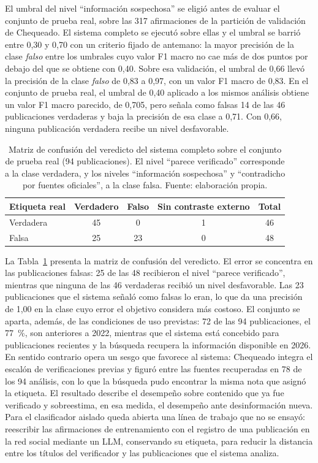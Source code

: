 El umbral del nivel \enquote{información sospechosa} se eligió antes de evaluar el conjunto de prueba real, sobre las 317 afirmaciones de la partición de validación de Chequeado. El sistema completo se ejecutó sobre ellas y el umbral se barrió entre 0,30 y 0,70 con un criterio fijado de antemano: la mayor precisión de la clase \textit{falso} entre los umbrales cuyo valor F1 macro no cae más de dos puntos por debajo del que se obtiene con 0,40. Sobre esa validación, el umbral de 0,66 llevó la precisión de la clase \textit{falso} de 0,83 a 0,97, con un valor F1 macro de 0,83. En el conjunto de prueba real, el umbral de 0,40 aplicado a los mismos análisis obtiene un valor F1 macro parecido, de 0,705, pero señala como falsas 14 de las 46 publicaciones verdaderas y baja la precisión de esa clase a 0,71. Con 0,66, ninguna publicación verdadera recibe un nivel desfavorable.

\begin{table}[t]
  \centering
  \small
  \caption{Matriz de confusión del veredicto del sistema completo sobre el conjunto de prueba real (94 publicaciones). El nivel \enquote{parece verificado} corresponde a la clase verdadera, y los niveles \enquote{información sospechosa} y \enquote{contradicho por fuentes oficiales}, a la clase falsa. Fuente: elaboración propia.}
  \label{tab:matriz-sistema}
  \begin{tabular}{@{}l c c c c@{}}
    \hline
    \textbf{Etiqueta real} & \textbf{Verdadero} & \textbf{Falso} & \textbf{Sin contraste externo} & \textbf{Total} \\
    \hline
    Verdadera & 45 & 0 & 1 & 46 \\
    Falsa & 25 & 23 & 0 & 48 \\
    \hline
  \end{tabular}
\end{table}

La Tabla~\ref{tab:matriz-sistema} presenta la matriz de confusión del veredicto. El error se concentra en las publicaciones falsas: 25 de las 48 recibieron el nivel \enquote{parece verificado}, mientras que ninguna de las 46 verdaderas recibió un nivel desfavorable. Las 23 publicaciones que el sistema señaló como falsas lo eran, lo que da una precisión de 1,00 en la clase cuyo error el objetivo considera más costoso. El conjunto se aparta, además, de las condiciones de uso previstas: 72 de las 94 publicaciones, el 77~\%, son anteriores a 2022, mientras que el sistema está concebido para publicaciones recientes y la búsqueda recupera la información disponible en 2026. En sentido contrario opera un sesgo que favorece al sistema: Chequeado integra el escalón de verificaciones previas y figuró entre las fuentes recuperadas en 78 de los 94 análisis, con lo que la búsqueda pudo encontrar la misma nota que asignó la etiqueta. El resultado describe el desempeño sobre contenido que ya fue verificado y sobreestima, en esa medida, el desempeño ante desinformación nueva. Para el clasificador aislado queda abierta una línea de trabajo que no se ensayó: reescribir las afirmaciones de entrenamiento con el registro de una publicación en la red social mediante un LLM, conservando su etiqueta, para reducir la distancia entre los títulos del verificador y las publicaciones que el sistema analiza.

